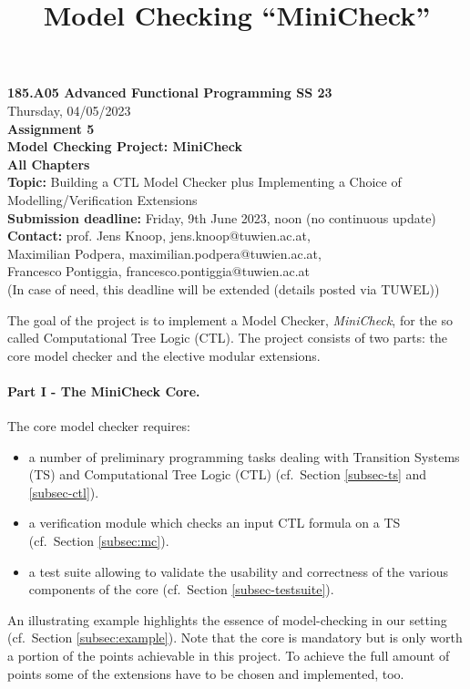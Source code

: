 \documentclass{article}
\title{Model Checking ``MiniCheck''}
\begin{document}
\large
\begin{center}
  {\Large \textbf{185.A05 Advanced Functional Programming SS 23}}  \\ [1ex] 
            Thursday, 04/05/2023 \\
               {\Large \textbf{Assignment 5}} \\[.5ex]
              {\Large \textbf{Model Checking Project: MiniCheck}} \\[.5ex]
                 \textbf{All Chapters}  \\ [.75ex]
           \textbf{Topic:} Building a CTL Model Checker plus Implementing a Choice of Modelling/Verification Extensions  \\[1ex]
          \textbf{Submission deadline:} Friday, 9th June 2023, noon (no continuous update)  \\ [0.5ex]
          \textbf{Contact:} prof. Jens Knoop, jens.knoop@tuwien.ac.at, \\
                            Maximilian Podpera, maximilian.podpera@tuwien.ac.at, \\
                            Francesco Pontiggia, francesco.pontiggia@tuwien.ac.at \\
                     (In case of need, this deadline will be extended (details posted via TUWEL))
\end{center}

\vspace{1ex}
\noindent
\noindent

\newcommand{\code}[1]{\texttt{#1}}

\noindent
The goal of the project is to implement a  Model Checker, \textit{MiniCheck}, 
for the so called Computational Tree Logic (CTL). 
The project consists of two parts: the core model checker and 
the elective modular extensions. 

\paragraph{Part I - The MiniCheck Core.} The core model checker requires: 
\begin{itemize}
    \item a number of preliminary programming tasks dealing with Transition Systems (TS)
          and Computational Tree Logic (CTL) (cf.~Section \ref{subsec-ts} and \ref{subsec-ctl}).
    \item a verification module which checks an input CTL formula on a TS (cf.~Section \ref{subsec:mc}).
    \item a test suite allowing to validate the usability and correctness of the
          various components of the core (cf.~Section \ref{subsec-testsuite}).
\end{itemize}  
An illustrating example highlights the essence of model-checking in our setting (cf.~Section \ref{subsec:example}). Note that the core is mandatory but is only worth a portion of the points achievable in this project. To achieve the full amount of points some of the extensions have to be chosen and implemented, too.
\end{document}
